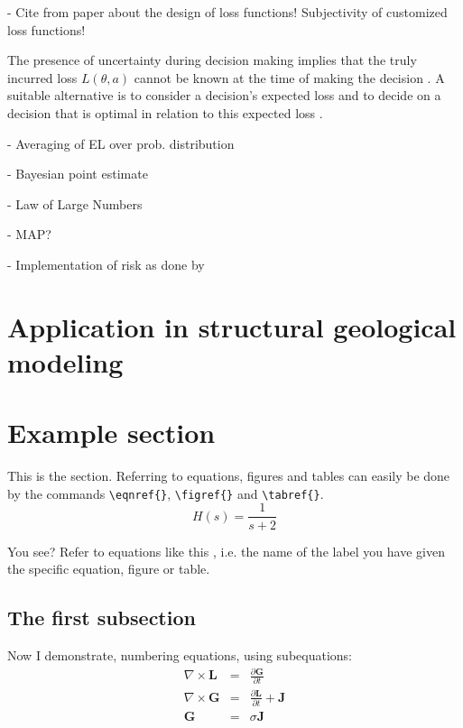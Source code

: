         - Cite from paper about the design of loss functions! Subjectivity of customized loss functions!
        
        The presence of uncertainty during decision making implies that the truly incurred loss $L(\theta,a)$ cannot be known at the time of making the decision \cite{berger2013stat}. A suitable alternative is to consider a decision's expected loss and to decide on a decision that is optimal in relation to this expected loss \cite{berger2013stat}. 
        
        - Averaging of EL over prob. distribution
        
        - Bayesian point estimate
        
        - Law of Large Numbers
        
        - MAP?
        
        - Implementation of risk as done by \cite{davidson2015}
        
        \section{Application in structural geological modeling}          

        \section{Example section}

        This is the section. Referring to equations, figures and tables can easily be done by the commands \verb"\eqnref{}",
        \verb"\figref{}" and \verb"\tabref{}".
        \begin{equation}\label{eq:First}
        H(s) = \frac{1}{s+2}
        \end{equation}

        You see? Refer to equations like this , i.e. the name of the label you have given the specific equation, figure or table.
        
        \subsection{The first subsection}
  
        Now I demonstrate, numbering equations, using subequations:
	  \begin{subequations}
		\begin{eqnarray}
    \label{2eq1d1}
	  \nabla\times\mathbf{L}  &=& \frac{\partial\mathbf{G}}{\partial t} \\
    \label{2eq1d2}
  	\nabla\times\mathbf{G}  &=& \frac{\partial\mathbf{L}}{\partial t} + \mathbf{J} \\
    \label{2eq1d3}
    \mathbf{G}              &=& \sigma\mathbf{J}
		\end{eqnarray}
			  \end{subequations}
	
